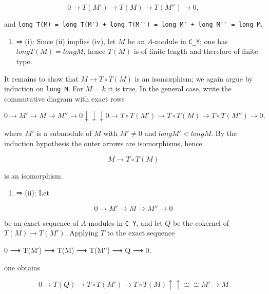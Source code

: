 \documentclass[
]{article}
\newenvironment{Shaded}{}{}
\newcommand{\NormalTok}[1]{#1}
\providecommand{\tightlist}{%
  \setlength{\itemsep}{0pt}\setlength{\parskip}{0pt}}
\begin{document}
\[
0 \longrightarrow T(M') \longrightarrow T(M) \longrightarrow T(M'') \longrightarrow 0,
\]

and
\texttt{long\ T(M)\ =\ long\ T(M′)\ +\ long\ T(M′′)\ =\ long\ M′\ +\ long\ M′′\ =\ long\ M}.

\begin{enumerate}
\def\labelenumi{(\roman{enumi})}
\setcounter{enumi}{1}
\tightlist
\item
  ⇒ (i): Since (ii) implies (iv), let \(M\) be an \(A\)-module in
  \texttt{C\_Y}; one has \(long T(M) = long M\), hence \(T(M)\) is of
  finite length and therefore of finite type.
\end{enumerate}

It remains to show that \(M \to T \circ T(M)\) is an isomorphism; we
again argue by induction on \texttt{long\ M}. For \(M = k\) it is true.
In the general case, write the commutative diagram with exact rows

\[
0 \longrightarrow  M'  \longrightarrow  M  \longrightarrow  M'' \longrightarrow 0
      \downarrow        \downarrow       \downarrow
0 \longrightarrow T\circ T(M') \longrightarrow T\circ T(M) \longrightarrow T\circ T(M'') \longrightarrow 0,
\]

where \(M'\) is a submodule of \(M\) with \(M' \neq 0\) and
\(long M' < long M\). By the induction hypothesis the outer arrows are
isomorphisms, hence

\[
M \longrightarrow T \circ T(M)
\]

is an isomorphism.

\begin{enumerate}
\def\labelenumi{(\roman{enumi})}
\tightlist
\item
  ⇒ (ii): Let
\end{enumerate}

\[
0 \longrightarrow M' \longrightarrow M \longrightarrow M'' \longrightarrow 0
\]

be an exact sequence of \(A\)-modules in \texttt{C\_Y}, and let \(Q\) be
the cokernel of \(T(M) \to T(M')\). Applying \(T\) to the exact sequence

\begin{Shaded}
\begin{Highlighting}[]
\NormalTok{0 ⟶ T(M′) ⟶ T(M) ⟶ T(M′′) ⟶ Q ⟶ 0,}
\end{Highlighting}
\end{Shaded}

one obtains

\[
0 \longrightarrow T(Q) \longrightarrow T\circ T(M') \longrightarrow T\circ T(M)
                \uparrow          \uparrow
                \cong          \cong
                M'    \longrightarrow    M
\]
\end{document}
